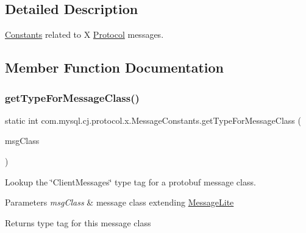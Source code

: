 \subsection{Detailed Description}
\mbox{\hyperlink{classcom_1_1mysql_1_1cj_1_1_constants}{Constants}} related to X \mbox{\hyperlink{interfacecom_1_1mysql_1_1cj_1_1protocol_1_1_protocol}{Protocol}} messages. 

\subsection{Member Function Documentation}
\mbox{\label{classcom_1_1mysql_1_1cj_1_1protocol_1_1x_1_1_message_constants_a669e4c77f9271db3a03dfdbabe9f8687}} 
\subsubsection{\texorpdfstring{get\+Type\+For\+Message\+Class()}{getTypeForMessageClass()}}
{\footnotesize\ttfamily static int com.\+mysql.\+cj.\+protocol.\+x.\+Message\+Constants.\+get\+Type\+For\+Message\+Class (\begin{DoxyParamCaption}\item[{Class$<$? extends Message\+Lite $>$}]{msg\+Class }\end{DoxyParamCaption})\hspace{0.3cm}{\ttfamily [static]}}

Lookup the \char`\"{}\+Client\+Messages\char`\"{} type tag for a protobuf message class.


\begin{DoxyParams}{Parameters}
{\em msg\+Class} & message class extending \mbox{\hyperlink{}{Message\+Lite}} \\
\hline
\end{DoxyParams}
\begin{DoxyReturn}{Returns}
type tag for this message class 
\end{DoxyReturn}


